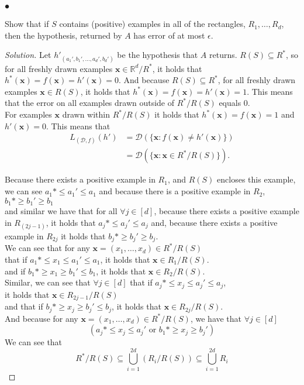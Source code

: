 \documentclass[10pt, a4paper, twoside]{amsart}
\newcommand{\R}{\ensuremath{\mathbb{R}}}
\newenvironment{solution}
               {\let\oldqedsymbol=\qedsymbol
                \renewcommand{\qedsymbol}{$\blacktriangleleft$}
                \begin{proof}[Solution]}
               {\end{proof}
                \renewcommand{\qedsymbol}{\oldqedsymbol}}
\begin{document}
\subsubsection*{$\bullet$}
Show that if $S$ contains (positive) examples in all of the rectangles, $R_1,\ldots , R_d$, then the hypothesis, returned by $A$ has error of at most $\epsilon$. \\
\begin{solution}
  Let $h'_{(a_1',b_1',\ldots,a_d',b_d')}$ be the hypothesis that $A$ returns. $R(S)\subseteq R^*$, so for all freshly drawn examples $\mathbf{x} \in \R^d/R^*$,  it holds that $h^*(\mathbf{x})=f(\mathbf{x}) = h'(\mathbf{x}) = 0$. And because $R(S)\subseteq R^*$, for all freshly drawn examples $\mathbf{x} \in R(S)$, it holds that $h^*(\mathbf{x})=f(\mathbf{x}) = h'(\mathbf{x}) = 1$. This means that the error on all examples drawn outside of $R^*/R(S)$ equals $0$.\\
  For examples $\mathbf{x}$ drawn within $R^*/R(S)$ it holds that $h^*(\mathbf{x})=f(\mathbf{x}) = 1$ and $h'(\mathbf{x}) = 0$. This means that 
    \begin{align*}
    L_{(\mathcal{D},f)}(h') &= \mathcal{D}(\{\mathbf{x}: f(\mathbf{x}) \neq h'(\mathbf{x})\}) \\ 
                            &= \mathcal{D}(\{\mathbf{x}:\mathbf{x}\in R^*/R(S)\}).
    \end{align*}

  Because there exists a positive example in $R_1$, and $R(S)$ encloses this example, we can see $a_1* \leq a_1' \leq a_1$ and 
  because there is a positive example in $R_2$, $b_1* \geq b_1' \geq b_1$ \\
  and similar we have that for all $\forall j \in [d]$, because there exists a positive example in $R_{(2j-1)}$, it holds that  $a_j* \leq a_j' \leq a_j$ and, because there exists a positive example in $R_{2j}$ it holds that  $b_j* \geq b_j' \geq b_j$.\\
  We can see that for any $\mathbf{x} = (x_1,\ldots ,x_d) \in R^*/R(S)$\\
  that if $a_1* \leq x_1 \leq a_1' \leq a_1$, it holds that $\mathbf{x} \in R_1/R(S)$.\\
  and if $b_1* \geq x_1 \geq b_1' \leq b_1$, it holds that $\mathbf{x} \in R_2/R(S)$.\\
  Similar, we can see that $\forall j \in [d]$ that if  $a_j* \leq x_j \leq a_j' \leq a_j$,\\
  it holds that $\mathbf{x} \in R_{2j-1}/R(S)$\\
  and that if $b_j* \geq x_j \geq b_j' \leq b_j$, it holds that $\mathbf{x} \in R_{2j}/R(S)$.\\
  And because for any $\mathbf{x} = (x_1,\ldots,x_d) \in R^*/R(S)$, we have that $\forall j\in [d]$
\begin{equation*}
  (a_j* \leq x_j \leq a_j' \text{ or } b_1* \geq x_j \geq b_j')
\end{equation*}
We can see that
\begin{equation*}
R^*/R(S) \subseteq \bigcup_{i=1}^{2d}(R_i/R(S)) \subseteq \bigcup_{i=1}^{2d}R_i
\end{equation*}
   

\end{solution}
\end{document}
